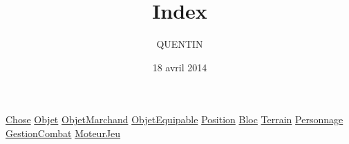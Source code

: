 \documentclass[11pt]{article}
\title{Index}
\author{QUENTIN}
\date{18 avril 2014}
\begin{document}
\maketitle

\setcounter{tocdepth}{3}
\tableofcontents
\vspace*{1cm}
\href{file:///home/quentin/Documents/travail/CPS/CPS-Projet/tests/tChose.org}{Chose}
\href{file:///home/quentin/Documents/travail/CPS/CPS-Projet/tests/tObjet.org}{Objet}
\href{file:///home/quentin/Documents/travail/CPS/CPS-Projet/tests/tObjetMarchand.org}{ObjetMarchand}
\href{file:///home/quentin/Documents/travail/CPS/CPS-Projet/tests/tObjetEquipable.org}{ObjetEquipable}
\href{file:///home/quentin/Documents/travail/CPS/CPS-Projet/tests/tPosition.org}{Position}
\href{file:///home/quentin/Documents/travail/CPS/CPS-Projet/tests/tBloc.org}{Bloc}
\href{file:///home/quentin/Documents/travail/CPS/CPS-Projet/tests/tTerrain.org}{Terrain}
\href{file:///home/quentin/Documents/travail/CPS/CPS-Projet/tests/tPersonnage.org}{Personnage}
\href{file:///home/quentin/Documents/travail/CPS/CPS-Projet/tests/tGestionCombat.org}{GestionCombat}
\href{file:///home/quentin/Documents/travail/CPS/CPS-Projet/tests/tMoteurJeu.org}{MoteurJeu}
\end{document}
